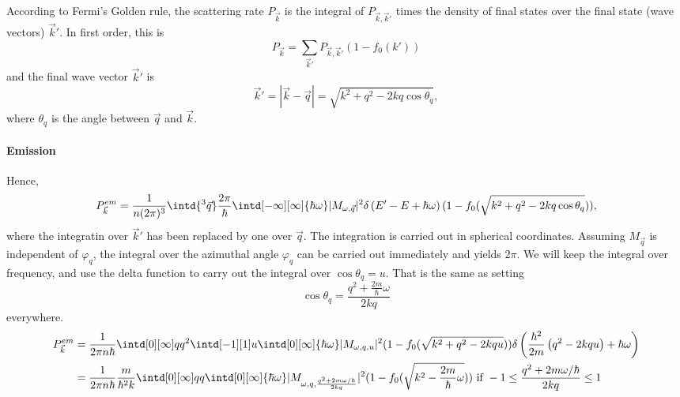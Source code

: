 \documentclass[physics,phd,nolot,nolof]{uccthesis}%
\begin{document}
{According to Fermi's Golden rule, the scattering rate $P_{\vec k}$ is the integral of $P_{\vec k,\vec k'}$ 
times the density of final states 
over the final state (wave vectors) $\vec k'$.
In first order, this is
\begin{equation}
  P_{\vec k} =\sum_{\vec k'} P_{\vec k,\vec k'} (1-f_0(k'))
  \label{eq:Scattering-rate}
\end{equation}
and the final wave vector $\vec k'$ is
\begin{equation}
  \vec k' =|\vec k -\vec q| = \sqrt{k^2 +q^2 -2 kq \cos\theta_q},
  \label{eq:kprime}
\end{equation}
where $\theta_q$ is the angle between $\vec q$ and $\vec k$.
\paragraph*{Emission}
Hence, 
\begin{equation}
  P^{em}_{\vec k} =\frac{1}{n(2\pi)^3}\intd{^3\vec q} 
  \frac{2\pi}{\hbar} 
  \intd[-\infty][\infty]{\hbar\omega}  |M_{\omega,\vec q}|^2 \delta\left(E' - E +\hbar\omega \right)
  (1-f_0( \sqrt{k^2 +q^2 -2 kq \cos\theta_q})),
  \label{eq:Scattering-rate2}
\end{equation}
where the integratin over $\vec k'$ has been replaced by one over $\vec q$.
The integration is carried out in spherical coordinates. 
Assuming $M_{\vec q}$ is independent of $\varphi_q$, the integral over the azimuthal angle $\varphi_q$ can be carried out immediately and yields $2\pi$.
We will keep the integral over frequency, and use the delta function to carry out the integral over  $\cos\theta_q=u$.
That is the same as setting
\begin{equation}
  \cos\theta_q=\frac{q^2 +\frac{2m}{\hbar}\omega}{2kq}
  \label{eq:costhetaq-em}
\end{equation}
everywhere.
\begin{equation}
  \begin{split}
  P^{em}_{\vec k} &
  = \frac{1}{ 2\pi n \hbar}\intd[0][\infty]q q^2\intd[-1][1]u
  \intd[0][\infty]{\hbar\omega}|M_{\omega,q,u}|^2
  (1-f_0( \sqrt{k^2 +q^2 -2 kq u}))
  \delta\left(\frac{\hbar^2}{2m}\left(q^2  - 2kq u \right) +\hbar\omega \right)\\
 & =\frac{1}{ 2\pi n \hbar}
  \frac{m}{\hbar^2 k}
 \intd[0][\infty]q q
 \intd[0][\infty]{\hbar\omega}
  |M_{\omega,q, \frac{q^2 +2m\omega/\hbar}{2kq}}|^2
(1-f_0( \sqrt{k^2 -\frac{2m}{\hbar}\omega})) 
\text{ if } -1\leq\frac{q^2 +2m\omega/\hbar}{2kq}\leq 1

\end{split}
\end{equation}}
\end{document}
